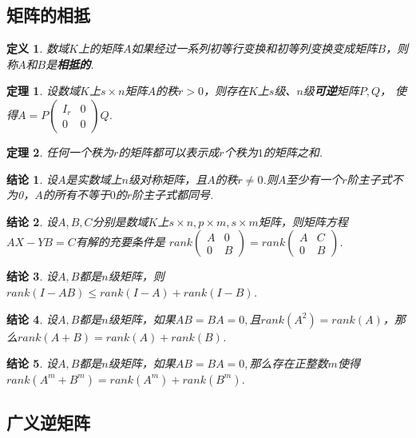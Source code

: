 \documentclass[UTF8]{article}
\newtheorem{thrm}{定理}[subsection]
\newtheorem{defn}{定义}[subsection]
\newtheorem{ccl}{结论}[subsection]
\begin{document}
\subsection{矩阵的相抵}
\begin{defn}
  数域$K$上的矩阵$A$如果经过一系列初等行变换和初等列变换变成矩阵$B$，则称$A$和$B$是\textbf{相抵的}.
\end{defn}
\begin{thrm}
  设数域$K$上$s\times n$矩阵$A$的秩$r>0$，则存在$K$上$s$级、$n$级\textbf{可逆}矩阵$P,Q$，
  使得$A=P\begin{pmatrix} I_r&0\\0&0 \end{pmatrix}Q$.
\end{thrm}
\begin{thrm}
  任何一个秩为$r$的矩阵都可以表示成$r$个秩为$1$的矩阵之和.
\end{thrm}
\begin{ccl}
  设$A$是实数域上$n$级对称矩阵，且$A$的秩$r\ne 0$.则$A$至少有一个$r$阶主子式不为0，$A$的所有不等于$0$的$r$阶主子式都同号.
\end{ccl}
\begin{ccl}
  设$A,B,C$分别是数域$K$上$s\times n,p\times m,s\times m$矩阵，则矩阵方程$AX-YB=C$有解的充要条件是
  $rank\begin{pmatrix} A&0\\0&B \end{pmatrix}=rank\begin{pmatrix} A&C\\0&B \end{pmatrix}$.
\end{ccl}
\begin{ccl}
  设$A,B$都是$n$级矩阵，则$rank(I-AB)\le rank(I-A)+rank(I-B)$.
\end{ccl}
\begin{ccl}
  设$A,B$都是$n$级矩阵，如果$AB=BA=0,$且$rank(A^2)=rank(A)$，那么$rank(A+B)=rank(A)+rank(B)$.
\end{ccl}
\begin{ccl}
  设$A,B$都是$n$级矩阵，如果$AB=BA=0,$那么存在正整数$m$使得$rank(A^m+B^m)=rank(A^m)+rank(B^m)$.
\end{ccl}

\subsection{广义逆矩阵}
\end{document}

